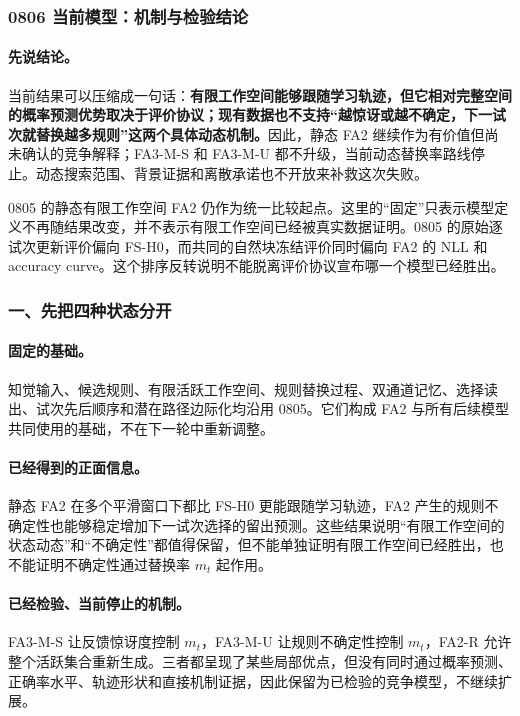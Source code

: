 
\subsubsection{0806 当前模型：机制与检验结论}

\paragraph{先说结论。}
当前结果可以压缩成一句话：\textbf{有限工作空间能够跟随学习轨迹，但它相对完整空间的概率预测优势取决于评价协议；现有数据也不支持“越惊讶或越不确定，下一试次就替换越多规则”这两个具体动态机制。}因此，静态 FA2 继续作为有价值但尚未确认的竞争解释；FA3-M-S 和 FA3-M-U 都不升级，当前动态替换率路线停止。动态搜索范围、背景证据和离散承诺也不开放来补救这次失败。

0805 的静态有限工作空间 FA2 仍作为统一比较起点。这里的“固定”只表示模型定义不再随结果改变，并不表示有限工作空间已经被真实数据证明。0805 的原始逐试次更新评价偏向 FS-H0，而共同的自然块冻结评价同时偏向 FA2 的 NLL 和 accuracy curve。这个排序反转说明不能脱离评价协议宣布哪一个模型已经胜出。


\subsubsection{一、先把四种状态分开}

\paragraph{固定的基础。}
知觉输入、候选规则、有限活跃工作空间、规则替换过程、双通道记忆、选择读出、试次先后顺序和潜在路径边际化均沿用 0805。它们构成 FA2 与所有后续模型共同使用的基础，不在下一轮中重新调整。

\paragraph{已经得到的正面信息。}
静态 FA2 在多个平滑窗口下都比 FS-H0 更能跟随学习轨迹，FA2 产生的规则不确定性也能够稳定增加下一试次选择的留出预测。这些结果说明“有限工作空间的状态动态”和“不确定性”都值得保留，但不能单独证明有限工作空间已经胜出，也不能证明不确定性通过替换率 $m_t$ 起作用。

\paragraph{已经检验、当前停止的机制。}
FA3-M-S 让反馈惊讶度控制 $m_t$，FA3-M-U 让规则不确定性控制 $m_t$，FA2-R 允许整个活跃集合重新生成。三者都呈现了某些局部优点，但没有同时通过概率预测、正确率水平、轨迹形状和直接机制证据，因此保留为已检验的竞争模型，不继续扩展。

